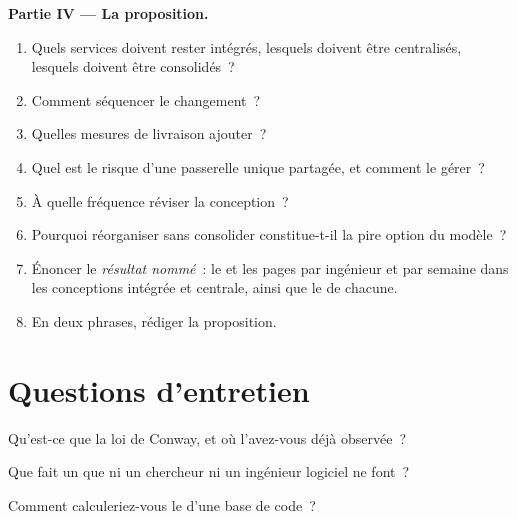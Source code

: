 \begin{problem}
\medskip\noindent\textbf{Partie IV --- La proposition.}
\begin{enumerate}[resume]
\item Quels services doivent rester intégrés, lesquels doivent être centralisés, lesquels doivent être consolidés~?
\item Comment séquencer le changement~?
\item Quelles mesures de livraison ajouter~?
\item Quel est le risque d'une passerelle unique partagée, et comment le gérer~?
\item À quelle fréquence réviser la conception~?
\item Pourquoi réorganiser sans consolider constitue-t-il la pire option du modèle~?
\item Énoncer le \emph{résultat nommé}~: le  et les pages par ingénieur et par semaine dans les conceptions intégrée et centrale, ainsi que le 
de chacune.
\item En deux phrases, rédiger la proposition.
\end{enumerate}
\end{problem}

\section{Questions d'entretien}

\begin{interviewq}\label{iq:fm:engineering-organisation-design:1}
Qu'est-ce que la loi de Conway, et où l'avez-vous déjà observée~?
\end{interviewq}

\begin{interviewq}\label{iq:fm:engineering-organisation-design:2}
Que fait un  que ni un chercheur ni un ingénieur logiciel ne font~?
\end{interviewq}

\begin{interviewq}\label{iq:fm:engineering-organisation-design:3}
Comment calculeriez-vous le  d'une base de code~?
\end{interviewq}

